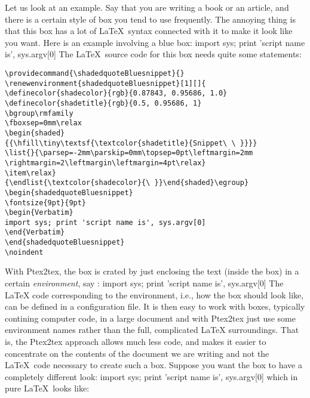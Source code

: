 \documentclass[a4paper,11pt]{article}
\begin{document}
Let us look at an example.
Say that you are writing a book or an article, and there
is a certain style of box you tend to use frequently. The annoying thing is that
this box has a lot of \LaTeX~syntax connected with it to make it look like
you want. Here is an example involving a blue box:
\bsni
import sys; print 'script name is', sys.argv[0]
\esni
The \LaTeX~source code for this box needs quite some statements:
\begin{verbatim}
\providecommand{\shadedquoteBluesnippet}{}
\renewenvironment{shadedquoteBluesnippet}[1][]{
\definecolor{shadecolor}{rgb}{0.87843, 0.95686, 1.0}
\definecolor{shadetitle}{rgb}{0.5, 0.95686, 1}
\bgroup\rmfamily
\fboxsep=0mm\relax
\begin{shaded}
{{\hfill\tiny\textsf{\textcolor{shadetitle}{Snippet\ \ }}}}
\list{}{\parsep=-2mm\parskip=0mm\topsep=0pt\leftmargin=2mm
\rightmargin=2\leftmargin\leftmargin=4pt\relax}
\item\relax}
{\endlist{\textcolor{shadecolor}{\ }}\end{shaded}\egroup}
\begin{shadedquoteBluesnippet}
\fontsize{9pt}{9pt}
\begin{Verbatim}
import sys; print 'script name is', sys.argv[0]
\end{Verbatim}
\end{shadedquoteBluesnippet}
\noindent
\end{verbatim}
\noindent
With Ptex2tex, the box is crated by just enclosing the text (inside the box)
in a certain \emph{environment}, say :
\bdat
\bmybox
import sys; print 'script name is', sys.argv[0]
\emybox
\edat
The \LaTeX{} code corresponding to the  environment, i.e.,
how the box should look like, can be defined in a configuration file.
It is then easy to work with boxes, typically contining computer code,
in a large document and with Ptex2tex just use some environment names
rather than the full, complicated \LaTeX{} surroundings.
That is,
the
Ptex2tex approach allows much less code, and makes it easier to concentrate on the contents
of the document we are writing and not the \LaTeX~code necessary to create such
a box.
Suppose you want the box to have a completely different look:
\bcod
import sys; print 'script name is', sys.argv[0]
\ecod
which in pure \LaTeX~looks like:
\end{document}
